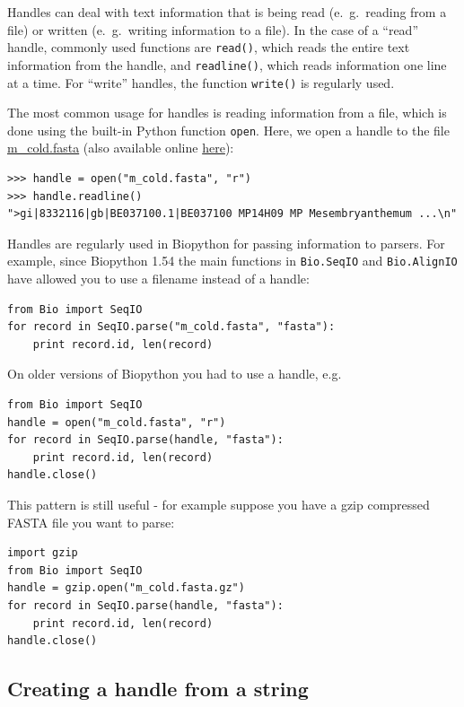 \documentclass{report}
\begin{document}
Handles can deal with text information that is being read (e.~g.~reading
from a file) or written (e.~g.~writing information to a file). In the
case of a ``read'' handle, commonly used functions are \verb|read()|,
which reads the entire text information from the handle, and
\verb|readline()|, which reads information one line at a time. For
``write'' handles, the function \verb|write()| is regularly used.

The most common usage for handles is reading information from a file,
which is done using the built-in Python function \verb|open|. Here, we open a
handle to the file \href{examples/m\_cold.fasta}{m\_cold.fasta}
(also available online
\href{http://biopython.org/DIST/docs/tutorial/examples/m\_cold.fasta}{here}):

\begin{verbatim}
>>> handle = open("m_cold.fasta", "r")
>>> handle.readline()
">gi|8332116|gb|BE037100.1|BE037100 MP14H09 MP Mesembryanthemum ...\n"
\end{verbatim}

Handles are regularly used in Biopython for passing information to parsers.
For example, since Biopython 1.54 the main functions in \verb|Bio.SeqIO|
and \verb|Bio.AlignIO| have allowed you to use a filename instead of a
handle:

\begin{verbatim}
from Bio import SeqIO
for record in SeqIO.parse("m_cold.fasta", "fasta"):
    print record.id, len(record)
\end{verbatim}

On older versions of Biopython you had to use a handle, e.g.

\begin{verbatim}
from Bio import SeqIO
handle = open("m_cold.fasta", "r")
for record in SeqIO.parse(handle, "fasta"):
    print record.id, len(record)
handle.close()
\end{verbatim}

This pattern is still useful - for example suppose you have a gzip
compressed FASTA file you want to parse:

\begin{verbatim}
import gzip
from Bio import SeqIO
handle = gzip.open("m_cold.fasta.gz")
for record in SeqIO.parse(handle, "fasta"):
    print record.id, len(record)
handle.close()
\end{verbatim}

\subsection{Creating a handle from a string}
\end{document}
